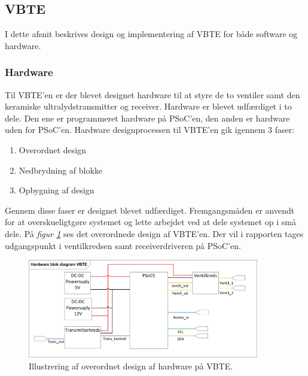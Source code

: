 


\subsection{VBTE}
I dette afsnit beskrives design og implementering af VBTE for både software og hardware. 
\subsubsection{Hardware}
Til VBTE'en er der blevet designet hardware til at styre de to ventiler samt den keramiske ultralydstransmitter og receiver. Hardware er blevet udfærdiget i to dele. Den ene er programmeret hardware på PSoC'en, den anden er hardware uden for PSoC'en. Hardware designprocessen til VBTE'en gik igennem 3 faser:
\begin{enumerate}
\item Overordnet design
\item Nedbrydning af blokke
\item Opbygning af design
\end{enumerate}
Gennem disse faser er designet blevet udfærdiget. Fremgangsmåden er anvendt for at overskueligtgøre systemet og lette arbejdet ved at dele systemet op i små dele. På \textit{figur \ref{fig:HWVBTE}} ses det overordnede design af VBTE'en. Der vil i rapporten tages udgangspunkt i ventilkredsen samt receiverdriveren på PSoC'en.
\begin{figure}[H]
\centering
\includegraphics[width = 0.9\textwidth]{billeder/HWVBTE}
\caption{Illustrering af overordnet design af hardware på VBTE.}
\label{fig:HWVBTE}
\end{figure}
